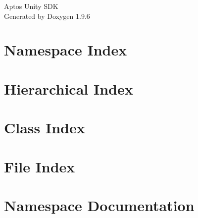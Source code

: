 \documentclass[twoside]{book}
\newcommand{\+}{\discretionary{\mbox{\scriptsize$\hookleftarrow$}}{}{}}
\newcommand{\clearemptydoublepage}{%
    \newpage{\pagestyle{empty}\cleardoublepage}%
  }
\begin{document}
  \raggedbottom
    \hypersetup{pageanchor=false,
                bookmarksnumbered=true,
                pdfencoding=unicode
               }
  \begin{titlepage}
  \vspace*{7cm}
  \begin{center}%
  {\Large Aptos Unity SDK}\\
  \vspace*{1cm}
  {\large Generated by Doxygen 1.9.6}\\
  \end{center}
  \end{titlepage}
  \clearemptydoublepage
  \tableofcontents
  \clearemptydoublepage
  \hypersetup{pageanchor=true}
\chapter{Namespace Index}

\chapter{Hierarchical Index}

\chapter{Class Index}

\chapter{File Index}

\chapter{Namespace Documentation}










\end{document}
